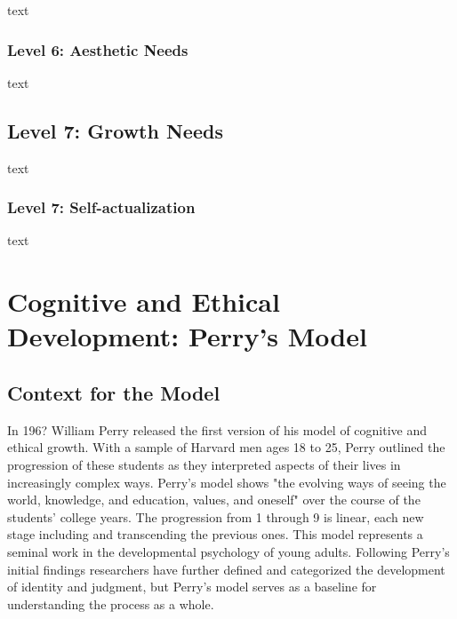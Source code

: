 text

\subsubsection{Level 6: Aesthetic Needs}

text

\subsection{Level 7: Growth Needs}

text

\subsubsection{Level 7: Self-actualization}

text


\section{Cognitive and Ethical Development: Perry's Model}


\subsection{Context for the Model}
                                             
In 196? William Perry released the first version of his model of cognitive and ethical growth.  With a  sample of Harvard men ages 18 to 25, Perry outlined the progression of these students as they interpreted aspects of their lives in increasingly complex ways.  Perry's model shows "the evolving ways of seeing the world, knowledge, and education, values, and oneself" over the course of the students' college years.  The progression from 1 through 9 is linear, each new stage including and transcending the previous ones.  This model represents a seminal work in the developmental psychology of young adults.  Following Perry's initial findings researchers have further defined and categorized the development of identity and judgment, but Perry's model serves as a baseline for understanding the process as a whole.

